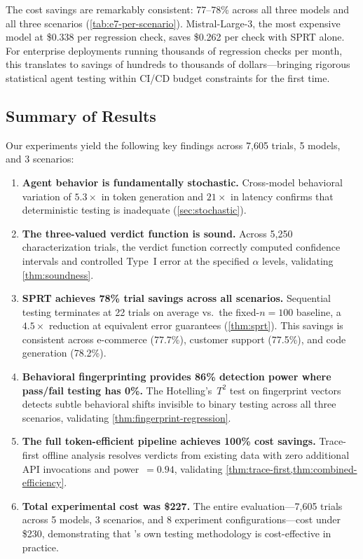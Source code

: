 The cost savings are remarkably consistent: 77--78\% across all three
models and all three scenarios (\cref{tab:e7-per-scenario}).
Mistral-Large-3, the most expensive model at \$0.338 per regression
check, saves \$0.262 per check with SPRT alone. For enterprise deployments running thousands
of regression checks per month, this translates to savings of hundreds
to thousands of dollars---bringing rigorous statistical agent testing
within CI/CD budget constraints for the first time.

\subsection{Summary of Results}
\label{sec:experiments:summary}

Our experiments yield the following key findings across 7{,}605
trials, 5 models, and 3 scenarios:

\begin{enumerate}[leftmargin=*]
  \item \textbf{Agent behavior is fundamentally stochastic.}
    Cross-model behavioral variation of $5.3\times$ in token generation
    and $21\times$ in latency confirms that deterministic testing is
    inadequate (\cref{sec:stochastic}).

  \item \textbf{The three-valued verdict function is sound.}
    Across 5,250 characterization trials, the verdict function correctly
    computed confidence intervals and controlled Type~I error at the
    specified $\alpha$ levels, validating \cref{thm:soundness}.

  \item \textbf{SPRT achieves 78\% trial savings across all scenarios.}
    Sequential testing terminates at 22 trials on average vs.\ the
    fixed-$n = 100$ baseline, a $4.5\times$ reduction at equivalent
    error guarantees (\cref{thm:sprt}). This savings is consistent
    across e-commerce (77.7\%), customer support (77.5\%), and code
    generation (78.2\%).

  \item \textbf{Behavioral fingerprinting provides 86\% detection power
    where pass/fail testing has 0\%.}
    The Hotelling's~$T^2$ test on fingerprint vectors detects subtle
    behavioral shifts invisible to binary testing across all three
    scenarios, validating \cref{thm:fingerprint-regression}.

  \item \textbf{The full token-efficient pipeline achieves 100\% cost
    savings.}
    Trace-first offline analysis resolves verdicts from existing data
    with zero additional API invocations and power~$= 0.94$,
    validating \cref{thm:trace-first,thm:combined-efficiency}.

  \item \textbf{Total experimental cost was \$227.}
    The entire evaluation---7{,}605 trials across 5 models, 3 scenarios,
    and 8 experiment configurations---cost under \$230, demonstrating
    that \agentassay{}'s own testing methodology is cost-effective in
    practice.
\end{enumerate}

